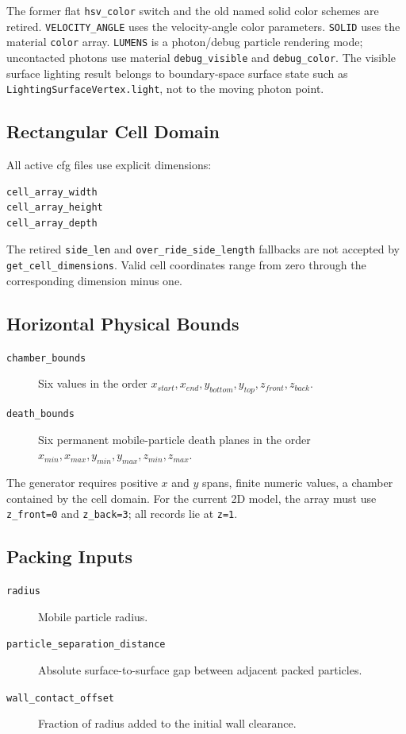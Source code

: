 The former flat \texttt{hsv\_color} switch and the old named solid color
schemes are retired.  \texttt{VELOCITY\_ANGLE} uses the velocity-angle color
parameters.  \texttt{SOLID} uses the material \texttt{color} array.
\texttt{LUMENS} is a photon/debug particle rendering mode; uncontacted
photons use material \texttt{debug\_visible} and \texttt{debug\_color}.  The
visible surface lighting result belongs to boundary-space surface state such
as \texttt{LightingSurfaceVertex.light}, not to the moving photon point.

\subsection{Rectangular Cell Domain}

All active cfg files use explicit dimensions:
\begin{verbatim}
cell_array_width
cell_array_height
cell_array_depth
\end{verbatim}

The retired \texttt{side\_len} and
\texttt{over\_ride\_side\_length} fallbacks are not accepted by
\texttt{get\_cell\_dimensions}.  Valid cell coordinates range from zero
through the corresponding dimension minus one.

\subsection{Horizontal Physical Bounds}

\begin{description}
    \item[\texttt{chamber\_bounds}] Six values in the order
    $x_{start},x_{end},y_{bottom},y_{top},z_{front},z_{back}$.
    \item[\texttt{death\_bounds}] Six permanent mobile-particle death planes
    in the order \(x_{min},x_{max},y_{min},y_{max},z_{min},z_{max}\).
\end{description}

The generator requires positive $x$ and $y$ spans, finite numeric values,
a chamber contained by the cell domain.  For the current 2D model, the array must use
\texttt{z\_front=0} and \texttt{z\_back=3}; all records lie at
\texttt{z=1}.

\subsection{Packing Inputs}

\begin{description}
    \item[\texttt{radius}] Mobile particle radius.
    \item[\texttt{particle\_separation\_distance}] Absolute
    surface-to-surface gap between adjacent packed particles.
    \item[\texttt{wall\_contact\_offset}] Fraction of radius added to the
    initial wall clearance.
\end{description}

